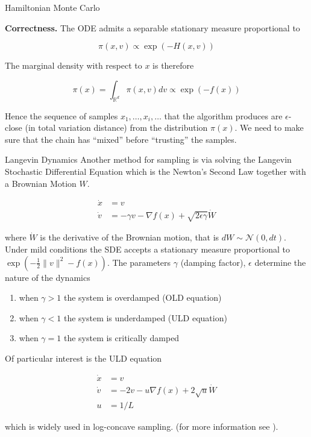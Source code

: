 \documentclass[10pt]{beamer}
\begin{document}
\begin{frame}[allowframebreaks]{Hamiltonian Monte Carlo}
    \framebreak
    
    \textbf{Correctness.} The ODE admits a separable stationary measure proportional to
    
    $$\pi(x, v) \propto \exp(-H(x,v))$$
    
    The marginal density with respect to $x$ is therefore
    
    $$\pi(x) = \int_{\mathbb R^d} \pi(x, v) d v \propto \exp(-f(x))$$
    
    Hence the sequence of samples $x_1, \dots, x_i, \dots$ that the algorithm produces are $\epsilon$-close (in total variation distance) from the distribution $\pi(x)$. We need to make sure that the chain has ``mixed'' before ``trusting'' the samples.
    
\end{frame}
    
\begin{frame}[allowframebreaks]{Langevin Dynamics}
    Another method for sampling is via solving the Langevin Stochastic Differential Equation which is the Newton's Second Law together with a Brownian Motion $W$. 
    
    \begin{align*}
        \dot x &= v \\
        \dot v &= - \gamma v - \nabla f(x) + \sqrt {2 \epsilon \gamma} \dot W
    \end{align*}
   
    where $\dot W$ is the derivative of the Brownian motion, that is $d W \sim \mathcal N(0, dt)$. Under mild conditions the SDE accepts a stationary measure proportional to $\exp \left ( - \frac 1 2 \| v \|^2  - f(x) \right )$. The parameters $\gamma$ (damping factor), $\epsilon$ determine the nature of the dynamics
    
    \begin{enumerate}
        \item when $\gamma > 1$ the system is overdamped (OLD equation)
        \item when $\gamma < 1$ the system is underdamped (ULD equation)
        \item when $\gamma = 1$ the system is critically damped
    \end{enumerate}

    \framebreak
    
    Of particular interest is the ULD equation
    
    \begin{align*}
        \dot x & = v \\
        \dot v & = -2v - u \nabla f(x) + 2 \sqrt u \dot W \\
        u & = 1 / L
    \end{align*}
    
    which is widely used in log-concave sampling. (for more information see \cite{lee2020logsmooth, lee2018algorithmic, gryazina2014random}). 
    
\end{frame}
\end{document}
